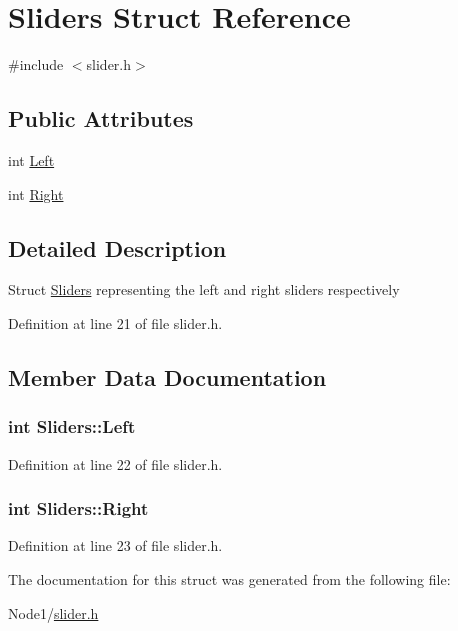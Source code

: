 \hypertarget{struct_sliders}{}\section{Sliders Struct Reference}
\label{struct_sliders}


{\ttfamily \#include $<$slider.\+h$>$}

\subsection*{Public Attributes}
\begin{DoxyCompactItemize}
\item 
int \hyperlink{struct_sliders_a7ba3b9ca46f73ff8e8d942ee9e4147b4}{Left}
\item 
int \hyperlink{struct_sliders_a2d43e10690bee0fefff9e526c3c9bee9}{Right}
\end{DoxyCompactItemize}


\subsection{Detailed Description}
Struct \hyperlink{struct_sliders}{Sliders} representing the left and right sliders respectively 

Definition at line 21 of file slider.\+h.



\subsection{Member Data Documentation}
\subsubsection[{\texorpdfstring{Left}{Left}}]{\setlength{\rightskip}{0pt plus 5cm}int Sliders\+::\+Left}\hypertarget{struct_sliders_a7ba3b9ca46f73ff8e8d942ee9e4147b4}{}\label{struct_sliders_a7ba3b9ca46f73ff8e8d942ee9e4147b4}


Definition at line 22 of file slider.\+h.

\subsubsection[{\texorpdfstring{Right}{Right}}]{\setlength{\rightskip}{0pt plus 5cm}int Sliders\+::\+Right}\hypertarget{struct_sliders_a2d43e10690bee0fefff9e526c3c9bee9}{}\label{struct_sliders_a2d43e10690bee0fefff9e526c3c9bee9}


Definition at line 23 of file slider.\+h.



The documentation for this struct was generated from the following file\+:\begin{DoxyCompactItemize}
\item 
Node1/\hyperlink{slider_8h}{slider.\+h}\end{DoxyCompactItemize}
